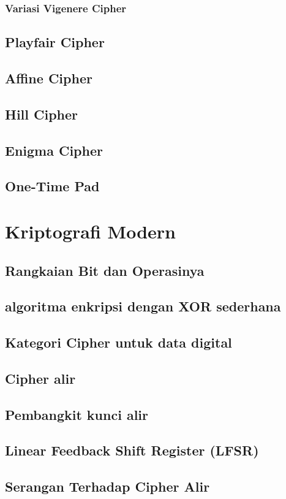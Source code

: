 \documentclass{book}
\begin{document}
        \subsection{Variasi Vigenere Cipher}
    \section{Playfair Cipher}
    \section{Affine Cipher}
    \section{Hill Cipher}
    \section{Enigma Cipher}
    \section{One-Time Pad}

\chapter{Kriptografi Modern}
    \section{Rangkaian Bit dan Operasinya}
    \section{algoritma enkripsi dengan XOR sederhana}
    \section{Kategori Cipher untuk data digital}
    \section{Cipher alir}
    \section{Pembangkit kunci alir}
    \section{Linear Feedback Shift Register (LFSR)}
    \section{Serangan Terhadap Cipher Alir}
\end{document}
